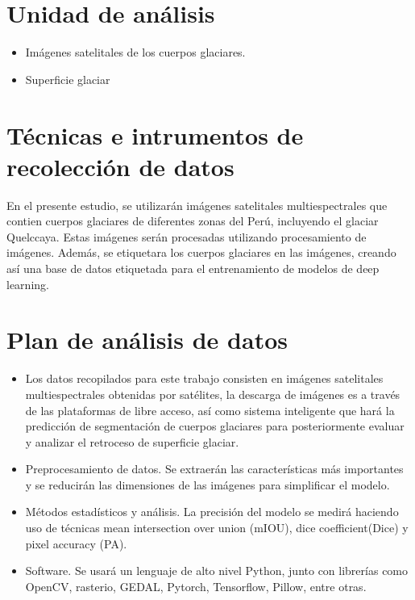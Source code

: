 \section{Unidad de análisis}
\begin{itemize}
	\item Imágenes satelitales de los cuerpos glaciares.
	\item Superficie glaciar
\end{itemize}

\section{Técnicas e intrumentos de recolección de datos}

En el presente estudio, se utilizarán imágenes satelitales multiespectrales que contien cuerpos glaciares de diferentes zonas del Perú, incluyendo el glaciar Quelccaya. Estas imágenes serán procesadas utilizando procesamiento de imágenes. Además, se etiquetara los cuerpos glaciares en las imágenes, creando así una base de datos etiquetada para el entrenamiento de modelos de deep learning.

\section{Plan de análisis de datos}
\begin{itemize}
	\item Los datos recopilados para este trabajo consisten en imágenes satelitales multiespectrales obtenidas por satélites, la descarga de imágenes es a través de las plataformas de libre acceso, así como sistema inteligente que hará la predicción de segmentación de cuerpos glaciares para posteriormente evaluar y analizar el retroceso de superficie glaciar.
	\item Preprocesamiento de datos. Se extraerán las características más importantes y se reducirán las dimensiones de las imágenes para simplificar el modelo.
	\item Métodos estadísticos y análisis. La precisión del modelo se medirá haciendo uso de técnicas mean intersection over union (mIOU), dice coefficient(Dice) y pixel accuracy (PA).
	\item Software. Se usará un lenguaje de alto nivel Python, junto con librerías como OpenCV, rasterio, GEDAL, Pytorch, Tensorflow, Pillow, entre otras.
\end{itemize}


